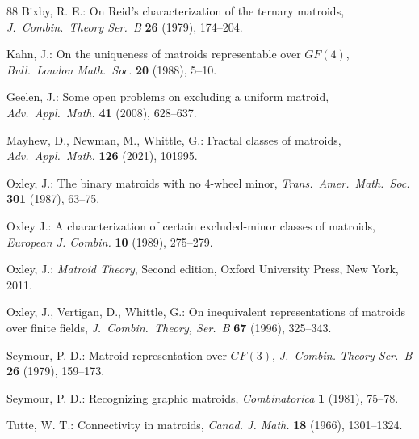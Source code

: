 \documentclass[11pt]{amsart}
\numberwithin{equation}{section} %
\begin{document}
\begin{thebibliography}{88}
 Bixby, R. E.: On Reid's characterization of the ternary matroids, {\em J.\ Combin.\ Theory Ser.\ B} {\bf 26} (1979), 174--204.

 Kahn, J.: On the uniqueness of matroids representable over $GF(4)$, {\em Bull.\ London Math.\ Soc.} {\bf 20} (1988), 5--10.

 Geelen, J.: Some open problems on excluding a uniform matroid, {\em Adv.\ Appl.\ Math.} {\bf 41} (2008), 628--637.

 Mayhew, D., Newman, M., Whittle, G.: Fractal classes of matroids, \emph{Adv.\ Appl.\ Math.} \textbf{126} (2021), 101995.

 Oxley, J.: The binary matroids with no $4$-wheel minor, {\em Trans.\ Amer.\ Math.\ Soc.} {\bf 301} (1987), 63--75.

 Oxley J.: A characterization of certain excluded-minor classes of matroids, {\em European J. Combin.} \textbf{10} (1989), 275–279.
		
 Oxley, J.: {\em Matroid Theory}, Second edition, Oxford University Press, New York, 2011.

 Oxley, J., Vertigan, D., Whittle, G.: On inequivalent representations of matroids over finite fields, {\em J.\ Combin.\ Theory, Ser.\ B} {\bf 67} (1996), 325--343.

 Seymour, P. D.: Matroid representation over $GF(3)$, {\em J.\ Combin. Theory Ser.\ B} {\bf 26} (1979), 159--173.

 Seymour, P. D.: Recognizing graphic matroids, {\em Combinatorica} {\bf 1} (1981), 75--78. 

 Tutte, W. T.: Connectivity in matroids, {\em Canad. J. Math.} {\bf 18} (1966), 1301--1324.
\end{thebibliography}
	
\end{document}

